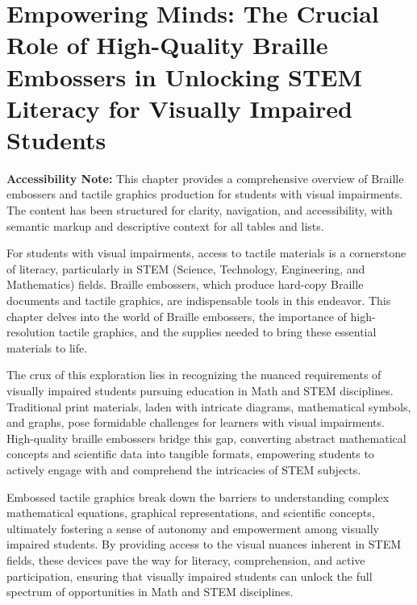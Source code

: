 \chapter{Empowering Minds: The Crucial Role of High-Quality Braille Embossers in Unlocking STEM Literacy for Visually Impaired Students}\label{ch4:braille-embossers}
\raggedright

\begin{raggedright}
	\textbf{Accessibility Note:} This chapter provides a comprehensive overview of Braille embossers and tactile graphics production for students with visual impairments. The content has been structured for clarity, navigation, and accessibility, with semantic markup and descriptive context for all tables and lists.
\end{raggedright}

For students with visual impairments, access to tactile materials is a cornerstone of literacy, particularly in STEM (Science, Technology, Engineering, and Mathematics) fields. Braille embossers, which produce hard-copy Braille documents and tactile graphics, are indispensable tools in this endeavor. This chapter delves into the world of Braille embossers, the importance of high-resolution tactile graphics, and the supplies needed to bring these essential materials to life.

The crux of this exploration lies in recognizing the nuanced requirements of visually impaired students pursuing education in Math and STEM disciplines. Traditional print materials, laden with intricate diagrams, mathematical symbols, and graphs, pose formidable challenges for learners with visual impairments. High-quality braille embossers bridge this gap, converting abstract mathematical concepts and scientific data into tangible formats, empowering students to actively engage with and comprehend the intricacies of STEM subjects.

Embossed tactile graphics break down the barriers to understanding complex mathematical equations, graphical representations, and scientific concepts, ultimately fostering a sense of autonomy and empowerment among visually impaired students. By providing access to the visual nuances inherent in STEM fields, these devices pave the way for literacy, comprehension, and active participation, ensuring that visually impaired students can unlock the full spectrum of opportunities in Math and STEM disciplines.

